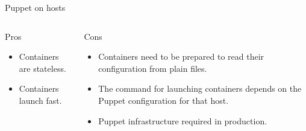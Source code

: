 \documentclass[presentation,c]{beamer}
\begin{document}
{
\begin{frame}[label=sec-13-4]{Puppet on hosts}

\begin{columns}
\begin{column}{0.5\textwidth}
\begin{block}{Pros}

\begin{itemize}
\item Containers are stateless.
\item Containers launch fast.
\end{itemize}
\end{block}
\end{column}

\begin{column}{0.5\textwidth}
\begin{block}{Cons}

\begin{itemize}
\item Containers need to be prepared to read their configuration from plain files.
\item The command for launching containers depends on the Puppet configuration for that host.
\item Puppet infrastructure required in production.
\end{itemize}
\end{block}
\end{column}
\end{columns}
\end{frame}
} %
\end{document}
